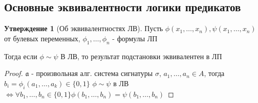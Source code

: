 \documentclass[a4paper]{article}
\theoremstyle{definition}
\newtheorem*{statement}{Утверждение}
\theoremstyle{remark}
\begin{document}
    \subsection{Основные эквивалентности логики предикатов}
    \begin{statement}[Об эквивалентностях ЛВ]
        Пусть $\phi(x_1, \dots, x_n), \psi(x_1, \dots, x_n)$ от булевых переменных, $\phi_1, \dots, \phi_n$ - формулы ЛП

        Тогда если $\phi \sim\psi$  В ЛВ, то результат подстановки эквивалентен в ЛП
    \end{statement}
    \begin{proof}
        $\mathfrak{a}$ - произвольная алг. система сигнатуры $\sigma$, $a_1, \dots, a_n \in A$,
        тогда $b_i = \phi_i(a_1, \dots, a_k)\in \{ 0, 1\} $
        $\phi \sim\psi$ в ЛВ $\Leftrightarrow \forall b_1, \dots, b_n \in \{ 0, 1\} \phi(b_1, \dots, b_n) = \psi (b_1, \dots, b_n)$
    \end{proof}
\end{document}
